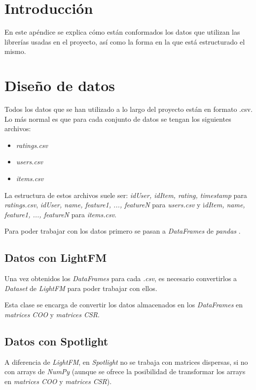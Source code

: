 
\section{Introducción}
En este apéndice se explica cómo están conformados los datos que utilizan las librerías usadas en el proyecto, así como la forma en la que está estructurado el mismo.

\section{Diseño de datos}
Todos los datos que se han utilizado a lo largo del proyecto están en formato .csv. Lo más normal es que para cada conjunto de datos se tengan los siguientes archivos:
\begin{itemize}
\tightlist
\item \textit{ratings.csv} 
\item \textit{users.csv}
\item \textit{items.csv}
\end{itemize}
La estructura de estos archivos suele ser: \textit{idUser, idItem, rating, timestamp} para \textit{ratings.csv}, \textit{idUser, name, feature1, ..., featureN} para \textit{users.csv} y i\textit{dItem, name, feature1, ..., featureN} para \textit{items.csv}.

Para poder trabajar con los datos primero se pasan a \textit{DataFrames} de \textit{pandas} \cite{dataframes}.

\subsection{Datos con LightFM}\label{datos-lightfm}
Una vez obtenidos los \textit{DataFrames} para cada \textit{.csv}, es necesario convertirlos a \textit{Dataset} de \textit{LightFM} \cite{dataset-lightfm} para poder trabajar con ellos.

Esta clase se encarga de convertir los datos almacenados en los \textit{DataFrames} en \textit{matrices COO} y \textit{matrices CSR}.

\subsection{Datos con Spotlight}\label{datos-spotlight}
A diferencia de \textit{LightFM}, en \textit{Spotlight} no se trabaja con matrices dispersas, si no con arrays de \textit{NumPy} (aunque se ofrece la posibilidad de transformar los arrays en \textit{matrices COO} y \textit{matrices CSR}).

